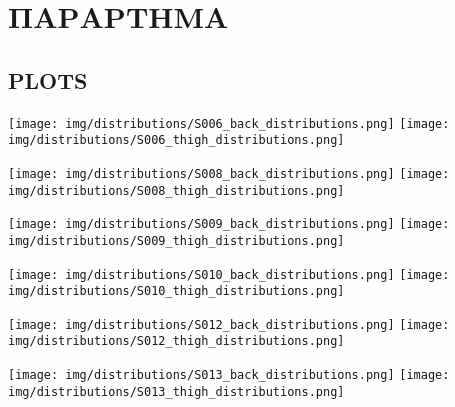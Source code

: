 \pagebreak
\chapter{ΠΑΡΑΡΤΗΜΑ}
    \section{PLOTS}

        \begin{multicols}{2} \centering \noindent
            \texttt{[image: img/distributions/S006\_back\_distributions.png]}
            \texttt{[image: img/distributions/S006\_thigh\_distributions.png]}
        \end{multicols}
        \begin{multicols}{2} \centering \noindent
            \texttt{[image: img/distributions/S008\_back\_distributions.png]}
            \texttt{[image: img/distributions/S008\_thigh\_distributions.png]}
        \end{multicols}
        \begin{multicols}{2} \centering \noindent
            \texttt{[image: img/distributions/S009\_back\_distributions.png]}
            \texttt{[image: img/distributions/S009\_thigh\_distributions.png]}
        \end{multicols}
        \pagebreak

        \begin{multicols}{2} \centering \noindent
            \texttt{[image: img/distributions/S010\_back\_distributions.png]}
            \texttt{[image: img/distributions/S010\_thigh\_distributions.png]}
        \end{multicols}
        \begin{multicols}{2} \centering \noindent
            \texttt{[image: img/distributions/S012\_back\_distributions.png]}
            \texttt{[image: img/distributions/S012\_thigh\_distributions.png]}
        \end{multicols}
        \begin{multicols}{2} \centering \noindent
            \texttt{[image: img/distributions/S013\_back\_distributions.png]}
            \texttt{[image: img/distributions/S013\_thigh\_distributions.png]}
        \end{multicols}
        \pagebreak

